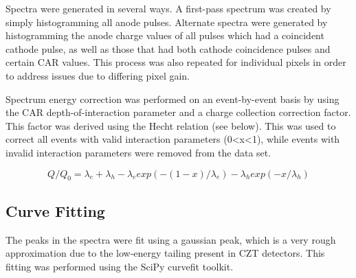 Spectra were generated in several ways. A first-pass spectrum was created by simply histogramming all anode pulses. Alternate spectra were generated by histogramming the anode charge values of all pulses which had a coincident cathode pulse, as well as those that had both cathode coincidence pulses and certain CAR values. This process was also repeated for individual pixels in order to address issues due to differing pixel gain.

Spectrum energy correction was performed on an event-by-event basis by using the CAR depth-of-interaction parameter and a charge collection correction factor. This factor was derived using the Hecht relation (see below). This was used to correct all events with valid interaction parameters (0<x<1), while events with invalid interaction parameters were removed from the data set.

\[Q/Q_0 = {\lambda}_e +{\lambda}_h -{\lambda}_e exp(-(1-x)/{\lambda}_e) - {\lambda}_h exp(-x/{\lambda}_h) \]


\subsection{Curve Fitting}
The peaks in the spectra were fit using a gaussian peak, which is a very rough approximation due to the low-energy tailing present in CZT detectors. This fitting was performed using the SciPy curvefit toolkit.





